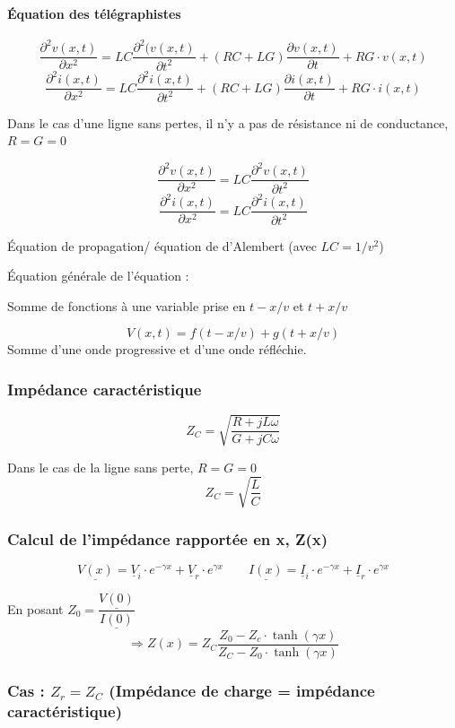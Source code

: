 \documentclass[12pt,a4paper]{report}
\begin{document}
\paragraph{Équation des télégraphistes}

\[
	\dfrac{\partial^2 v(x,t)}{\partial x^2} = LC \dfrac{\partial^2 (v(x,t)}{\partial t^2} + (RC + LG) \dfrac{\partial v(x,t)}{\partial t} + RG \cdot v(x,t)
\]
\[
	\dfrac{\partial^2 i(x,t)}{\partial x^2} = LC \dfrac{\partial^2 i(x,t)}{\partial t^2} + (RC + LG) \dfrac{\partial i(x,t)}{\partial t} + RG \cdot i(x,t)
\]

Dans le cas d'une ligne sans pertes, il n'y a pas de résistance ni de conductance, \(R=G = 0\)

\[
	\dfrac{\partial^2 v(x,t)}{\partial x^2} = LC \dfrac{\partial^2 v(x,t)}{\partial t^2}
\]
\[
	\dfrac{\partial^2 i(x,t)}{\partial x^2} = LC \dfrac{\partial^2 i(x,t)}{\partial t^2}
\]

Équation de propagation/ équation de d'Alembert (avec \(LC = 1/v^2 \))

Équation générale de l'équation :

Somme de fonctions à une variable prise en \(t - x/v\) et \(t + x/v\)

\[
	V(x,t) = f(t-x/v) + g(t+x/v)
\]
Somme d'une onde progressive et d'une onde réfléchie.

\subsubsection{Impédance caractéristique}

\[
	Z_C = \sqrt{\dfrac{R + jL\omega}{G + jC\omega}}
\]

Dans le cas de la ligne sans perte, \(R=G=0\)
\[
	Z_C = \sqrt{\dfrac{L}{C}}
\]

\subsubsection{Calcul de l'impédance rapportée en x, Z(x)}

\[
	\underline{V(x)} = \underline{V}_i \cdot e^{-\gamma x} + \underline{V}_r \cdot e^{\gamma x} \qquad  \underline{I(x)} = \underline{I}_i \cdot e^{-\gamma x} + \underline{I}_r \cdot e^{\gamma x}
\]

En posant \(Z_0 = \dfrac{\underline{V(0)}}{\underline{I(0)}}\)
\[
	\Rightarrow Z(x) = Z_C \dfrac{Z_0 - Z_c \cdot \tanh(\gamma x)}{Z_C - Z_0 \cdot \tanh (\gamma x)}
\]

\subsubsection{Cas : \(Z_r = Z_C\) (Impédance de charge = impédance caractéristique)}
\end{document}
